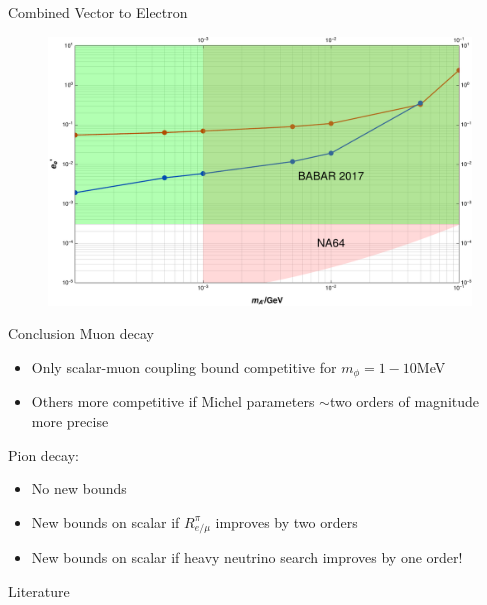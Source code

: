 \documentclass[11pt]{beamer}
\numberwithin{equation}{section}
\begin{document}
\begin{frame}{Combined Vector to Electron}
\begin{figure}[H]
  \centering
    \includegraphics[width=\textwidth]{../imgs/combinedVector}
\end{figure}
\end{frame}


\begin{frame}{Conclusion}
Muon decay
\pause
\begin{itemize}
\item Only scalar-muon coupling bound competitive for $m_\phi=1-10$MeV
\pause
\item Others more competitive if Michel parameters $\sim$two orders of magnitude more precise
\end{itemize}
\pause
Pion decay:
\pause
\begin{itemize}
\item No new bounds
\pause
\item New bounds on scalar if $R_{e/\mu}^\pi$ improves by two orders 
\pause
\item New bounds on scalar if heavy neutrino search improves by one order!
\end{itemize}
\end{frame}

\begin{frame}{Literature}
%


\end{frame}
\end{document}
